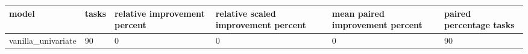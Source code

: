 \begin{tabular}{llllll}
\toprule
model & tasks & relative improvement percent & relative scaled improvement percent & mean paired improvement percent & paired percentage tasks \\
\midrule
vanilla\_univariate & 90 & 0 & 0 & 0 & 90 \\
\bottomrule
\end{tabular}
